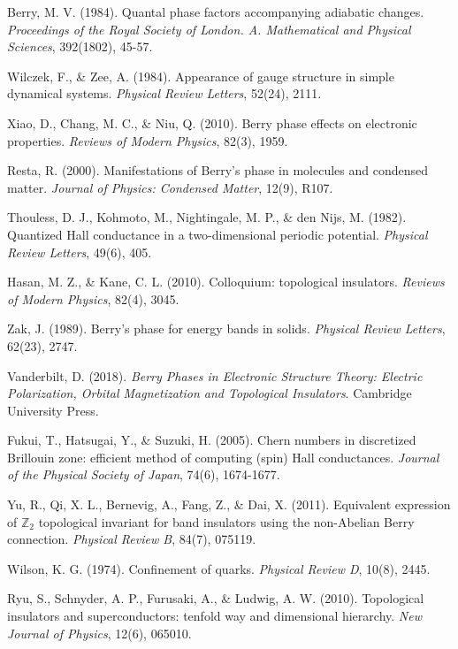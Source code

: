 \documentclass[12pt,a4paper]{article}
\begin{document}
\begin{thebibliography}{12}

 Berry, M. V. (1984). Quantal phase factors accompanying adiabatic changes. \textit{Proceedings of the Royal Society of London. A. Mathematical and Physical Sciences}, 392(1802), 45-57.

 Wilczek, F., \& Zee, A. (1984). Appearance of gauge structure in simple dynamical systems. \textit{Physical Review Letters}, 52(24), 2111.

 Xiao, D., Chang, M. C., \& Niu, Q. (2010). Berry phase effects on electronic properties. \textit{Reviews of Modern Physics}, 82(3), 1959.

 Resta, R. (2000). Manifestations of Berry's phase in molecules and condensed matter. \textit{Journal of Physics: Condensed Matter}, 12(9), R107.

 Thouless, D. J., Kohmoto, M., Nightingale, M. P., \& den Nijs, M. (1982). Quantized Hall conductance in a two-dimensional periodic potential. \textit{Physical Review Letters}, 49(6), 405.

 Hasan, M. Z., \& Kane, C. L. (2010). Colloquium: topological insulators. \textit{Reviews of Modern Physics}, 82(4), 3045.

 Zak, J. (1989). Berry's phase for energy bands in solids. \textit{Physical Review Letters}, 62(23), 2747.

 Vanderbilt, D. (2018). \textit{Berry Phases in Electronic Structure Theory: Electric Polarization, Orbital Magnetization and Topological Insulators}. Cambridge University Press.

 Fukui, T., Hatsugai, Y., \& Suzuki, H. (2005). Chern numbers in discretized Brillouin zone: efficient method of computing (spin) Hall conductances. \textit{Journal of the Physical Society of Japan}, 74(6), 1674-1677.

 Yu, R., Qi, X. L., Bernevig, A., Fang, Z., \& Dai, X. (2011). Equivalent expression of $\mathbb{Z}_2$ topological invariant for band insulators using the non-Abelian Berry connection. \textit{Physical Review B}, 84(7), 075119.

 Wilson, K. G. (1974). Confinement of quarks. \textit{Physical Review D}, 10(8), 2445.

 Ryu, S., Schnyder, A. P., Furusaki, A., \& Ludwig, A. W. (2010). Topological insulators and superconductors: tenfold way and dimensional hierarchy. \textit{New Journal of Physics}, 12(6), 065010.

\end{thebibliography}
\end{document}
